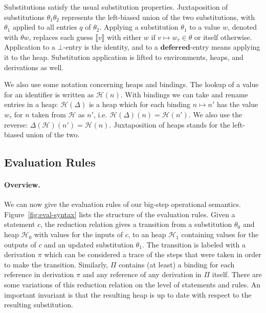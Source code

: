 \documentclass[preprint,natbib]{sigplanconf}
\newcommand\Statement{c}
\newcommand\Bindings{\Delta}
\newcommand\Type{\tau}
\newcommand\Heap{\mathcal{H}}
\newcommand\Substitution{\theta}
\newcommand\Deferred{\mathbf{deferred}}
\newcommand\Deriv{\pi}
\newcommand\DerivsEnv{\Pi}
\newcommand\sembrack[1]{\llbracket #1 \rrbracket}
\begin{document}
    Substitutions satisfy the usual substitution properties. Juxtaposition of substitutions $\Substitution_1 \Substitution_2$ represents the
    left-biased union of the two substitutions, with $\Substitution_1$ applied to all entries $q$ of $\Substitution_2$. Applying a
    substitution $\Substitution_1$ to a value $w$, denoted with $\Substitution w$, replaces each guess
    $\sembrack{v}$ with either $w$ if $v \mapsto w_{\Type} \in \Substitution$ or itself otherwise. Application to a $\bot$-entry is the
    identity, and to a $\Deferred$-entry means applying it to the heap. Substitution application is lifted to environments, heaps, and
    derivations as well.
    
    We also use some notation concerning heaps and bindings. The lookup of a value for an identifier is written as $\Heap(n)$. With
    bindings we can take and rename entries in a heap: $\Heap(\Bindings)$ is a heap which for each binding $n \mapsto n'$ has the value
    $w_{\Type}$ for $n$ taken from $\Heap$ as $n'$, i.e. $\Heap(\Bindings)(n) = \Heap(n')$. We also use the reverse:
    $\Bindings(\Heap)(n') = \Heap(n)$. Juxtaposition of heaps stands for the left-biased union of the two.

  \subsection{Evaluation Rules}

    \paragraph{Overview.}
    We can now give the evaluation rules of our big-step operational semantics. Figure~\ref{fig:eval-syntax} lists the structure of the
    evaluation rules. Given a statement $\Statement$, the reduction relation gives a transition from a substitution $\Substitution_0$ and
    heap $\Heap_0$ with values for the inputs of $\Statement$, to an heap $\Heap_1$ containing values for the outputs of $\Statement$ and
    an updated substitution $\Substitution_1$. The transition is labeled with a derivation $\Deriv$ which can be considered a trace of the
    steps that were taken in order to make the transition. Similarly, $\DerivsEnv$ contains (at least) a binding for each reference in
    derivation $\Deriv$ and any reference of any derivation in $\DerivsEnv$ itself. There are some variations of this reduction relation
    on the level of statements and rules. An important invariant is that the resulting heap is up to date with respect to the resulting
    substitution.
\end{document}
